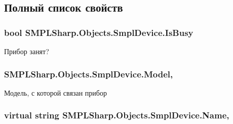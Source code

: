 \subsection{Полный список свойств}
\hypertarget{class_s_m_p_l_sharp_1_1_objects_1_1_smpl_device_a7e6939193f240d5f5642e07ef7d6b73e}{
\subsubsection[{Is\-Busy}]{\setlength{\rightskip}{0pt plus 5cm}bool S\-M\-P\-L\-Sharp.\-Objects.\-Smpl\-Device.\-Is\-Busy\hspace{0.3cm}{\ttfamily [get]}}}\label{d7/d39/class_s_m_p_l_sharp_1_1_objects_1_1_smpl_device_a7e6939193f240d5f5642e07ef7d6b73e}


Прибор занят? 

\hypertarget{class_s_m_p_l_sharp_1_1_objects_1_1_smpl_device_ad4036c2596ab7029b778ad45090df69b}{
\subsubsection[{Model}]{ S\-M\-P\-L\-Sharp.\-Objects.\-Smpl\-Device.\-Model\hspace{0.3cm}{\ttfamily [get]}, {\ttfamily [set]}}}\label{d7/d39/class_s_m_p_l_sharp_1_1_objects_1_1_smpl_device_ad4036c2596ab7029b778ad45090df69b}


Модель, с которой связан прибор 

\hypertarget{class_s_m_p_l_sharp_1_1_objects_1_1_smpl_device_a3525605581b83649d988ca1326b4732f}{
\subsubsection[{Name}]{\setlength{\rightskip}{0pt plus 5cm}virtual string S\-M\-P\-L\-Sharp.\-Objects.\-Smpl\-Device.\-Name\hspace{0.3cm}{\ttfamily [get]}, {\ttfamily [set]}}}\label{d7/d39/class_s_m_p_l_sharp_1_1_objects_1_1_smpl_device_a3525605581b83649d988ca1326b4732f}


